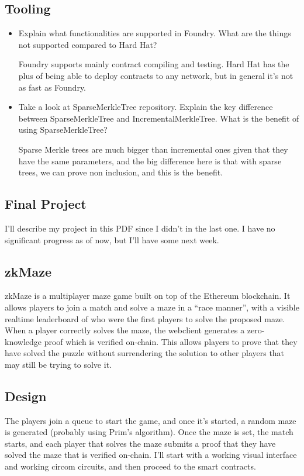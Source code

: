\documentclass{article}
\begin{document}
\subsection*{Tooling}
\begin{itemize}
    \item Explain what functionalities are supported in Foundry. What are the things not supported compared to Hard Hat? \par Foundry supports mainly contract compiling and testing. Hard Hat has the plus of being able to deploy contracts to any network, but in general it's not as fast as Foundry.
    \item Take a look at SparseMerkleTree repository. Explain the key difference between SparseMerkleTree and IncrementalMerkleTree. What is the benefit of using SparseMerkleTree? \par Sparse Merkle trees are much bigger than incremental ones given that they have the same parameters, and the big difference here is that with sparse trees, we can prove non inclusion, and this is the benefit.
\end{itemize}

\begin{center}
    \subsection*{Final Project}
\end{center}
I'll describe my project in this PDF since I didn't in the last one. I have no significant progress as of now, but I'll have some next week.
\bigbreak

\subsection*{zkMaze}
zkMaze is a multiplayer maze game built on top of the Ethereum blockchain. It allows players to join a match and solve a maze in a ``race manner'', with a visible realtime leaderboard of who were the first players to solve the proposed maze. When a player correctly solves the maze, the webclient generates a zero-knowledge proof which is verified on-chain. This allows players to prove that they have solved the puzzle without surrendering the solution to other players that may still be trying to solve it.

\subsection*{Design}
The players join a queue to start the game, and once it's started, a random maze is generated (probably using Prim's algorithm). Once the maze is set, the match starts, and each player that solves the maze submits a proof that they have solved the maze that is verified on-chain. I'll start with a working visual interface and working circom circuits, and then proceed to the smart contracts.
\end{document}
